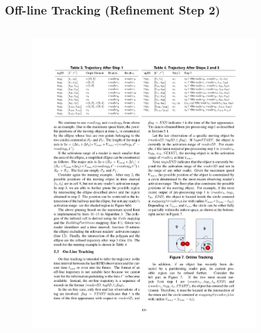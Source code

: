 
\begin{frame}
\frametitle{Off-line Tracking (Refinement Step 2)}

\begin{columns}[c]

  \vspace{-15pt}
  \begin{figure}[tb]
    \includegraphics[width=\columnwidth]{figures/2-1-10.pdf}
  \end{figure}
  \vspace{-20pt}
  \begin{figure}[tb]

\end{figure}
\end{columns}
\end{frame}
